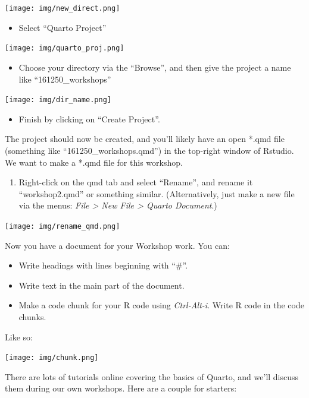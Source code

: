 \documentclass[
  letterpaper,
  DIV=11,
  numbers=noendperiod]{scrreprt}
\providecommand{\tightlist}{%
  \setlength{\itemsep}{0pt}\setlength{\parskip}{0pt}}\usepackage{longtable,booktabs,array}
\begin{document}
\texttt{[image: img/new\_direct.png]}

\begin{itemize}
\tightlist
\item
  Select ``Quarto Project''
\end{itemize}

\texttt{[image: img/quarto\_proj.png]}

\begin{itemize}
\tightlist
\item
  Choose your directory via the ``Browse'', and then give the project a
  name like ``161250\_workshops''
\end{itemize}

\texttt{[image: img/dir\_name.png]}

\begin{itemize}
\tightlist
\item
  Finish by clicking on ``Create Project''.
\end{itemize}

The project should now be created, and you'll likely have an open *.qmd
file (something like ``161250\_workshops.qmd'') in the top-right window
of Rstudio. We want to make a *.qmd file for this workshop.

\begin{enumerate}
\def\labelenumi{\arabic{enumi}.}
\setcounter{enumi}{4}
\tightlist
\item
  Right-click on the qmd tab and select ``Rename'', and rename it
  ``workshop2.qmd'' or something similar. (Alternatively, just make a
  new file via the menus: \emph{File \textgreater{} New File
  \textgreater{} Quarto Document}.)
\end{enumerate}

\texttt{[image: img/rename\_qmd.png]}

Now you have a document for your Workshop work. You can:

\begin{itemize}
\tightlist
\item
  Write headings with lines beginning with ``\#''.
\item
  Write text in the main part of the document.
\item
  Make a code chunk for your R code using \emph{Ctrl-Alt-i}. Write R
  code in the code chunks.
\end{itemize}

Like so:

\texttt{[image: img/chunk.png]}

There are lots of tutorials online covering the basics of Quarto, and
we'll discuss them during our own workshops. Here are a couple for
starters:
\end{document}
